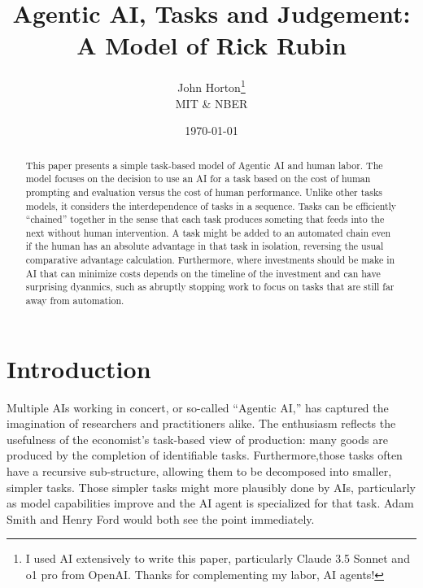 \documentclass{article}
\begin{document}
\title{Agentic AI, Tasks and Judgement:\\ A Model of Rick Rubin}
\author{John Horton\footnote{I used AI extensively to write this paper, particularly Claude 3.5 Sonnet and o1 pro from OpenAI. Thanks for complementing my labor, AI agents!}\\MIT \& NBER}
\date{\today{}}

\newcommand{\machine}[1]{\langle #1 \rangle}
\newcommand{\human}[1]{( #1 )}
\newcommand{\cost}[1]{C\{ #1 \}}
\newcommand{\costdo}[1]{C_H\{ #1 \}}
\newcommand{\costmanage}[1]{C_M\{ #1 \}}

\newcommand{\topic}[1]{\paragraph{#1}}

\maketitle

\begin{abstract}
\noindent This paper presents a simple task-based model of Agentic AI and human labor.
The model focuses on the decision to use an AI for a task based on the cost of human prompting and evaluation versus the cost of human performance. 
Unlike other tasks models, it considers the interdependence of tasks in a sequence. 
Tasks can be efficiently ``chained'' together in the sense that each task produces someting that feeds into the next without human intervention.
A task might be added to an automated chain even if the human has an absolute advantage in that task in isolation, reversing the usual comparative advantage calculation.
Furthermore, where investments should be make in AI that can minimize costs depends on the timeline of the investment and can have surprising dyanmics, such as abruptly stopping work to focus on tasks that are still far away from automation.
\end{abstract}

\onehalfspacing
  
\section{Introduction}
Multiple AIs working in concert, or so-called ``Agentic AI,'' has captured the imagination of researchers and practitioners alike.
The enthusiasm reflects the usefulness of the economist's task-based view of production: many goods are produced by the completion of identifiable tasks.
Furthermore,those tasks often have a recursive sub-structure, allowing them to be decomposed into smaller, simpler tasks.
Those simpler tasks might more plausibly done by AIs, particularly as model capabilities improve and the AI agent is specialized for that task. 
Adam Smith and Henry Ford would both see the point immediately. 
\end{document}
